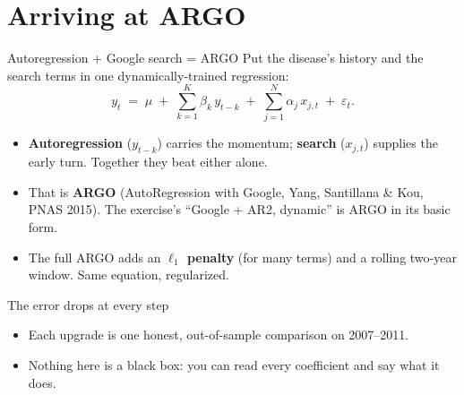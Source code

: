 \documentclass[aspectratio=169,11pt]{beamer}
\begin{document}
\section{Arriving at ARGO}

\begin{frame}{Autoregression + Google search = ARGO}
  Put the disease's history and the search terms in one dynamically-trained regression:
  \[
    y_t \;=\; \mu \;+\; \sum_{k=1}^{K}\beta_k\,y_{t-k}
      \;+\; \sum_{j=1}^{N}\alpha_j\,x_{j,t} \;+\; \varepsilon_t .
  \]
  \begin{itemize}
    \item \textbf{Autoregression} ($y_{t-k}$) carries the momentum; \textbf{search}
          ($x_{j,t}$) supplies the early turn. Together they beat either alone.
    \item That is \textbf{ARGO} (AutoRegression with Google, Yang, Santillana \& Kou, PNAS
          2015). The exercise's ``Google + AR2, dynamic'' is ARGO in its basic form.
    \item The full ARGO adds an \textbf{$\ell_1$ penalty} (for many terms) and a rolling
          two-year window. Same equation, regularized.
  \end{itemize}
\end{frame}

\begin{frame}{The error drops at every step}
  \begin{center}
  \end{center}
  \vspace{0.4em}
  \begin{itemize}
    \item Each upgrade is one honest, out-of-sample comparison on 2007--2011.
    \item Nothing here is a black box: you can read every coefficient and say what it does.
  \end{itemize}
\end{frame}
\end{document}
